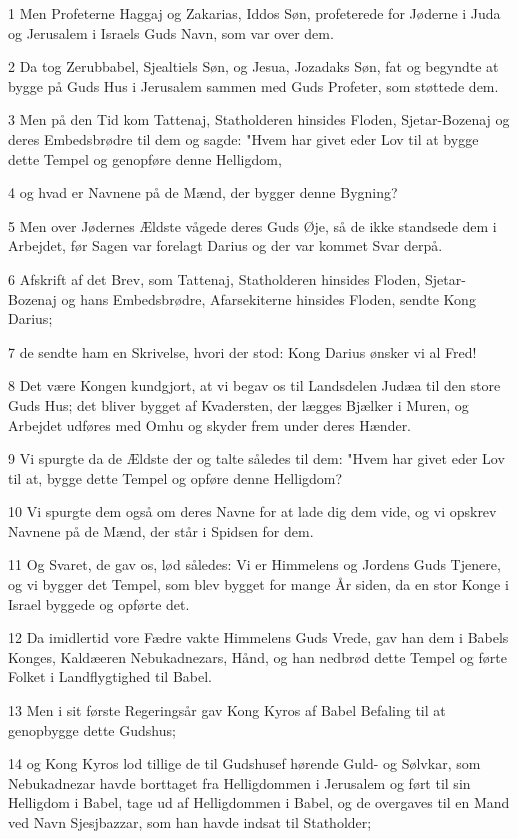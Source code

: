 \par 1 Men Profeterne Haggaj og Zakarias, Iddos Søn, profeterede for Jøderne i Juda og Jerusalem i Israels Guds Navn, som var over dem.
\par 2 Da tog Zerubbabel, Sjealtiels Søn, og Jesua, Jozadaks Søn, fat og begyndte at bygge på Guds Hus i Jerusalem sammen med Guds Profeter, som støttede dem.
\par 3 Men på den Tid kom Tattenaj, Statholderen hinsides Floden, Sjetar-Bozenaj og deres Embedsbrødre til dem og sagde: "Hvem har givet eder Lov til at bygge dette Tempel og genopføre denne Helligdom,
\par 4 og hvad er Navnene på de Mænd, der bygger denne Bygning?
\par 5 Men over Jødernes Ældste vågede deres Guds Øje, så de ikke standsede dem i Arbejdet, før Sagen var forelagt Darius og der var kommet Svar derpå.
\par 6 Afskrift af det Brev, som Tattenaj, Statholderen hinsides Floden, Sjetar-Bozenaj og hans Embedsbrødre, Afarsekiterne hinsides Floden, sendte Kong Darius;
\par 7 de sendte ham en Skrivelse, hvori der stod: Kong Darius ønsker vi al Fred!
\par 8 Det være Kongen kundgjort, at vi begav os til Landsdelen Judæa til den store Guds Hus; det bliver bygget af Kvadersten, der lægges Bjælker i Muren, og Arbejdet udføres med Omhu og skyder frem under deres Hænder.
\par 9 Vi spurgte da de Ældste der og talte således til dem: "Hvem har givet eder Lov til at, bygge dette Tempel og opføre denne Helligdom?
\par 10 Vi spurgte dem også om deres Navne for at lade dig dem vide, og vi opskrev Navnene på de Mænd, der står i Spidsen for dem.
\par 11 Og Svaret, de gav os, lød således: Vi er Himmelens og Jordens Guds Tjenere, og vi bygger det Tempel, som blev bygget for mange År siden, da en stor Konge i Israel byggede og opførte det.
\par 12 Da imidlertid vore Fædre vakte Himmelens Guds Vrede, gav han dem i Babels Konges, Kaldæeren Nebukadnezars, Hånd, og han nedbrød dette Tempel og førte Folket i Landflygtighed til Babel.
\par 13 Men i sit første Regeringsår gav Kong Kyros af Babel Befaling til at genopbygge dette Gudshus;
\par 14 og Kong Kyros lod tillige de til Gudshusef hørende Guld- og Sølvkar, som Nebukadnezar havde borttaget fra Helligdommen i Jerusalem og ført til sin Helligdom i Babel, tage ud af Helligdommen i Babel, og de overgaves til en Mand ved Navn Sjesjbazzar, som han havde indsat til Statholder;
